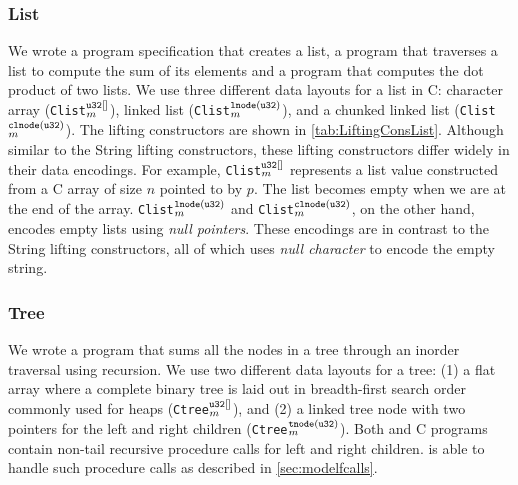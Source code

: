 

\subsubsection{List} We wrote a \SpecL{} program specification that creates a list, a
program that traverses a list to compute the sum of its elements and a program
that computes the dot product of two lists. We use three different
data layouts for a list in C: character array ({\tt Clist}$_m^{\tt u32[]}$),
linked list ({\tt Clist}$_m^{\tt lnode(u32)}$), and
a chunked linked list ({\tt Clist}$_m^{\tt clnode(u32)}$).
The lifting constructors are shown in \cref{tab:LiftingConsList}.
Although similar to the String lifting constructors, these lifting
constructors differ widely in their data encodings. For example,
{\tt Clist}$_m^{\tt u32[]}$ represents a list value constructed
from a C array of size $n$ pointed to by $p$. The list becomes empty
when we are at the end of the array. {\tt Clist}$_m^{\tt lnode(u32)}$
and {\tt Clist}$_m^{\tt clnode(u32)}$, on the other hand, encodes empty
lists using {\em null pointers}. These encodings are in contrast to the
String lifting constructors, all of which uses {\em null character} to
encode the empty string.



\subsubsection{Tree} We wrote a \SpecL{} program that sums all the nodes in a tree
through an inorder traversal using recursion. We use two different data layouts for a tree: 
(1) a flat array where a
complete binary tree is laid out in breadth-first search order commonly used for heaps ({\tt Ctree}$_m^{\tt u32[]}$),
and (2) a linked tree node with two pointers for the left and right children ({\tt Ctree}$_m^{\tt tnode(u32)}$).
Both \SpecL{} and C programs contain non-tail recursive procedure calls for left and right children.
\toolName{} is able to handle such procedure calls as described in \cref{sec:modelfcalls}.



